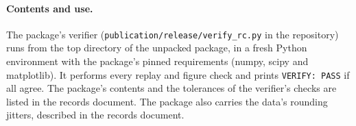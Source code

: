 
\paragraph{Contents and use.} The package's verifier (\texttt{publication/release/verify\_rc.py} in the repository) runs from the top directory of the unpacked package, in a fresh Python environment with the package's pinned requirements (numpy, scipy and matplotlib). It performs every replay and figure check and prints \texttt{VERIFY: PASS} if all agree. The package's contents and the tolerances of the verifier's checks are listed in the records document. The package also carries the data's rounding jitters, described in the records document.

